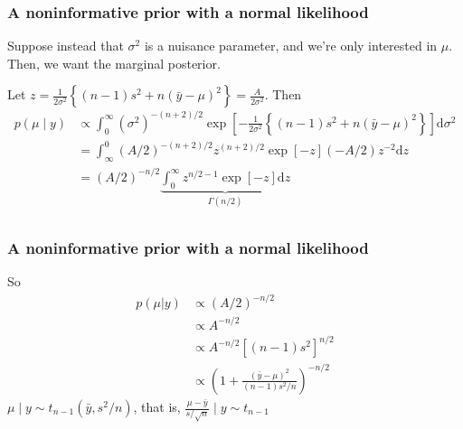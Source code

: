 \documentclass{beamer}
\begin{document}
\begin{frame}
\frametitle{A noninformative prior with a normal likelihood}

Suppose instead that $\sigma^2$ is a nuisance parameter, and we're only interested in $\mu$. Then, we want the marginal posterior.
\newline

Let $z = \frac{1}{2\sigma^2}\left\{(n-1)  s^2 + n(\bar{y} - \mu)^2 \right\} = \frac{A}{2\sigma^2}$. Then
\begin{align*}
p(\mu \mid y) &\propto \int_0^{\infty} (\sigma^2)^{-(n+2)/2} \exp\left[ - \frac{1}{2\sigma^2}\left\{(n-1)  s^2 + n(\bar{y} - \mu)^2 \right\} \right] \text{d} \sigma^2 \\
&= \int_{\infty}^0 (A/2)^{-(n+2)/2}z^{(n+2)/2} \exp\left[ - z \right] (-A/2)z^{-2}\text{d} z \\
&= (A/2)^{-n/2} \underbrace{\int^{\infty}_0 z^{n/2-1} \exp\left[ - z \right] \text{d} z}_{\Gamma(n/2)} \\
\end{align*}


\end{frame}

\begin{frame}
\frametitle{A noninformative prior with a normal likelihood}

So
\begin{align*}
p(\mu | y) &\propto (A/2)^{-n/2} \\
&\propto A^{-n/2} \\
&\propto A^{-n/2}[(n-1)  s^2]^{n/2} \\
&\propto \left(1 + \frac{(\bar{y} - \mu)^2}{(n-1)  s^2/n} \right)^{-n/2} 
\end{align*}
$\mu \mid y \sim t_{n-1}(\bar{y}, s^2/n)$, that is, $\frac{\mu -
  \bar{y}}{s/\sqrt{n}} \mid y \sim t_{n-1}$   

\end{frame}
\end{document}
